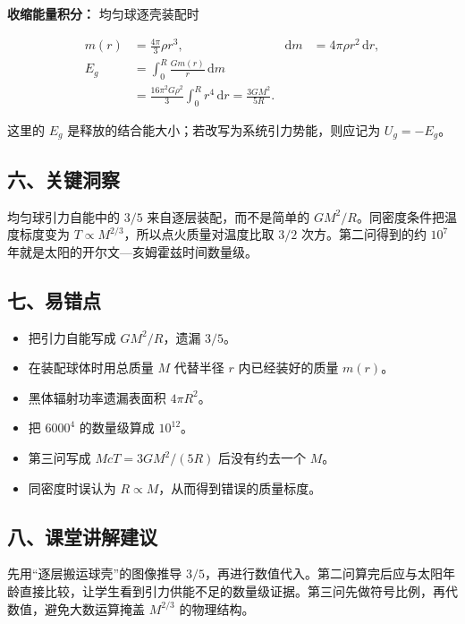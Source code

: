 \documentclass[12pt,a4paper,UTF8]{ctexart}
\newcommand{\tightlist}{\setlength{\itemsep}{0pt}\setlength{\parskip}{0pt}}
\begin{document}
\textbf{收缩能量积分：} 均匀球逐壳装配时

\[\begin{aligned}
m(r)&=\frac{4\pi}{3}\rho r^3,
&\mathrm dm&=4\pi\rho r^2\,\mathrm dr,\\
E_g&=\int_0^R\frac{Gm(r)}{r}\,\mathrm dm\\
&=\frac{16\pi^2G\rho^2}{3}\int_0^Rr^4\,\mathrm dr
=\frac{3GM^2}{5R}.
\end{aligned}\]

这里的 \(E_g\) 是释放的结合能大小；若改写为系统引力势能，则应记为
\(U_g=-E_g\)。

\subsection{六、关键洞察}\label{ux516dux5173ux952eux6d1eux5bdf-5}

均匀球引力自能中的 \(3/5\) 来自逐层装配，而不是简单的
\(GM^2/R\)。同密度条件把温度标度变为
\(T\propto M^{2/3}\)，所以点火质量对温度比取 \(3/2\)
次方。第二问得到的约 \(10^7\) 年就是太阳的开尔文---亥姆霍兹时间数量级。

\subsection{七、易错点}\label{ux4e03ux6613ux9519ux70b9-5}

\begin{itemize}
\tightlist
\item
  把引力自能写成 \(GM^2/R\)，遗漏 \(3/5\)。
\item
  在装配球体时用总质量 \(M\) 代替半径 \(r\) 内已经装好的质量 \(m(r)\)。
\item
  黑体辐射功率遗漏表面积 \(4\pi R^2\)。
\item
  把 \(6000^4\) 的数量级算成 \(10^{12}\)。
\item
  第三问写成 \(McT=3GM^2/(5R)\) 后没有约去一个 \(M\)。
\item
  同密度时误认为 \(R\propto M\)，从而得到错误的质量标度。
\end{itemize}

\subsection{八、课堂讲解建议}\label{ux516bux8bfeux5802ux8bb2ux89e3ux5efaux8bae-5}

先用``逐层搬运球壳''的图像推导
\(3/5\)，再进行数值代入。第二问算完后应与太阳年龄直接比较，让学生看到引力供能不足的数量级证据。第三问先做符号比例，再代数值，避免大数运算掩盖
\(M^{2/3}\) 的物理结构。
\end{document}
